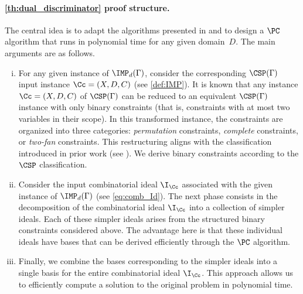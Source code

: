 \documentclass[11pt]{article}
\begin{document}
\paragraph{\cref{th:dual_discriminator} proof structure.}\label{sect:dual_discriminator_structure}
The central idea is to adapt the algorithms presented in \cite{BharathiM21, BharathiM25} and \cite{BulatovRSTOC22} to design a $\PC$ algorithm that runs in polynomial time for any given domain~$D$.
%
The main arguments are as follows.
\begin{enumerate}[(i)]
    \item For any given instance of $\IMP_d(\Gamma)$, consider the corresponding $\CSP(\Gamma)$ input instance $\Cc=(X,D,C)$ (see \cref{def:IMP}). It is known that any instance $\Cc = (X, D, C)$ of $\CSP(\Gamma)$ can be reduced to an equivalent $\CSP(\Gamma)$ instance with only binary constraints (that is, constraints with at most two variables in their scope). In this transformed instance, the constraints are organized into three categories: \emph{permutation} constraints, \emph{complete} constraints, or \emph{two-fan} constraints. This restructuring aligns with the classification introduced in prior work (see \cite{Cooper1994CharacterisingTC}). We derive binary constraints according to the $\CSP$ classification. \label{i}
    \item Consider the input combinatorial ideal $\I_\Cc$ associated with the given instance of $\IMP_d(\Gamma)$ (see \cref{eq:comb_Id}). The next phase consists in the decomposition of the combinatorial ideal $\I_{\Cc}$ into a collection of simpler ideals. Each of these simpler ideals arises from the structured binary constraints considered above. The advantage here is that these individual ideals have \GB bases that can be derived efficiently through the $\PC$ algorithm.
    \item Finally, we combine the \GB bases corresponding to the simpler ideals into a single \GB basis for the entire combinatorial ideal $\I_{\Cc}$. This approach allows us to efficiently compute a solution to the original problem in polynomial time.
\end{enumerate}
\end{document}

